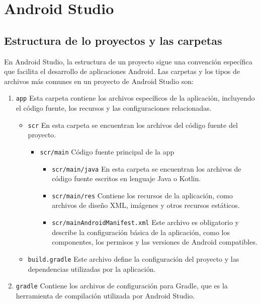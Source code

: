 \chapter{Android Studio}

\section{Estructura de lo proyectos y las carpetas}

En Android Studio, la estructura de un proyecto sigue una convención específica que facilita el desarrollo de aplicaciones Android. Las carpetas y los tipos de archivos más comunes en un proyecto de Android Studio son:

\begin{enumerate}
    \item \texttt{app} Esta carpeta contiene los archivos específicos de la aplicación, incluyendo el código fuente, los recursos y las configuraciones relacionadas.
    \begin{itemize}
        \item \texttt{scr} En esta carpeta se encuentran los archivos del código fuente del proyecto.
        \begin{itemize}
            \item \texttt{scr/main} Código fuente principal de la app
            \begin{itemize}
                \item \texttt{scr/main/java} En esta carpeta se encuentran los archivos de código fuente escritos en lenguaje Java o Kotlin.
                \item \texttt{scr/main/res} Contiene los recursos de la aplicación, como archivos de diseño XML, imágenes y otros recursos estáticos.
                \item \texttt{scr/mainAndroidManifest.xml}  Este archivo es obligatorio y describe la configuración básica de la aplicación, como los componentes, los permisos y las versiones de Android compatibles.
            \end{itemize}
        \end{itemize}
        \item \texttt{build.gradle} Este archivo define la configuración del proyecto y las dependencias utilizadas por la aplicación.
    \end{itemize}
    \item \texttt{gradle} Contiene los archivos de configuración para Gradle, que es la herramienta de compilación utilizada por Android Studio.

\end{enumerate}
